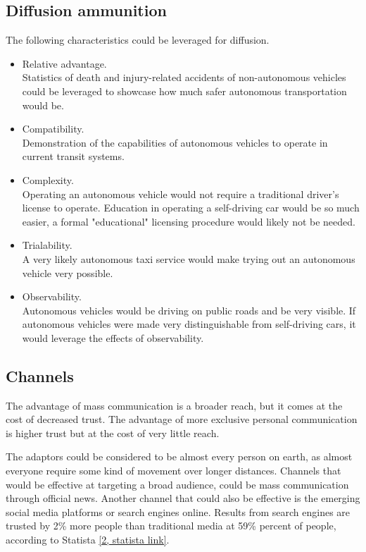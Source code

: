 \subsection*{Diffusion ammunition}
The following characteristics could be leveraged for diffusion.
\begin{itemize}
    \item Relative advantage.\\
    Statistics of death and injury-related accidents of non-autonomous vehicles could be leveraged to showcase how much safer autonomous transportation would be.
    \item Compatibility.\\
    Demonstration of the capabilities of autonomous vehicles to operate in current transit systems.
    \item Complexity.\\
    Operating an autonomous vehicle would not require a traditional driver's license to operate. Education in operating a self-driving car would be so much easier, a formal "educational" licensing procedure would likely not be needed. 
    \item Trialability.\\
    A very likely autonomous taxi service would make trying out an autonomous vehicle very possible.
    \item Observability.\\
    Autonomous vehicles would be driving on public roads and be very visible. If autonomous vehicles were made very distinguishable from self-driving cars, it would leverage the effects of observability.
\end{itemize}

\subsection*{Channels}
The advantage of mass communication is a broader reach, but it comes at the cost of decreased trust.
The advantage of more exclusive personal communication is higher trust but at the cost of very little reach. 

The adaptors could be considered to be almost every person on earth, as almost everyone require some kind of movement over longer distances.
Channels that would be effective at targeting a broad audience, could be mass communication through official news.
Another channel that could also be effective is the emerging social media platforms or search engines online. 
Results from search engines are trusted by 2\% more people than traditional media at 59\% percent of people, according to Statista \href{https://www.statista.com/statistics/381455/most-trusted-sources-of-news-and-info-worldwide/}{[2, statista link]}.  

